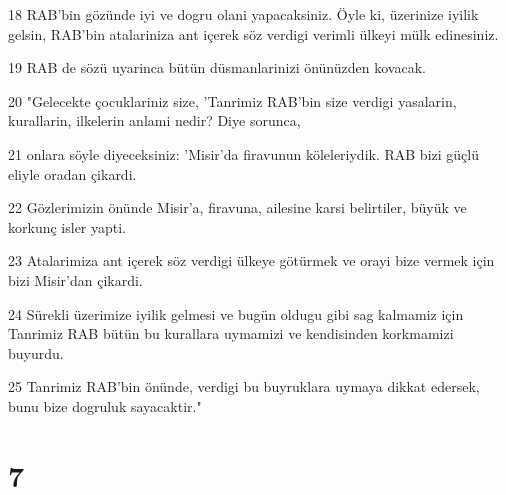 \par 18 RAB'bin gözünde iyi ve dogru olani yapacaksiniz. Öyle ki, üzerinize iyilik gelsin, RAB'bin atalariniza ant içerek söz verdigi verimli ülkeyi mülk edinesiniz.
\par 19 RAB de sözü uyarinca bütün düsmanlarinizi önünüzden kovacak.
\par 20 "Gelecekte çocuklariniz size, 'Tanrimiz RAB'bin size verdigi yasalarin, kurallarin, ilkelerin anlami nedir? Diye sorunca,
\par 21 onlara söyle diyeceksiniz: 'Misir'da firavunun köleleriydik. RAB bizi güçlü eliyle oradan çikardi.
\par 22 Gözlerimizin önünde Misir'a, firavuna, ailesine karsi belirtiler, büyük ve korkunç isler yapti.
\par 23 Atalarimiza ant içerek söz verdigi ülkeye götürmek ve orayi bize vermek için bizi Misir'dan çikardi.
\par 24 Sürekli üzerimize iyilik gelmesi ve bugün oldugu gibi sag kalmamiz için Tanrimiz RAB bütün bu kurallara uymamizi ve kendisinden korkmamizi buyurdu.
\par 25 Tanrimiz RAB'bin önünde, verdigi bu buyruklara uymaya dikkat edersek, bunu bize dogruluk sayacaktir."

\chapter{7}

